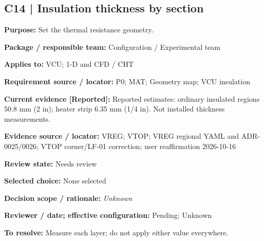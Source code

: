 \documentclass[11pt]{article}
\begin{document}
\par\noindent\begin{minipage}{\textwidth}\small\setlength{\parskip}{2pt}
\subsection*{C14 | Insulation thickness by section}
\textbf{Purpose:} Set the thermal resistance geometry.\par
\textbf{Package / responsible team:} Configuration / Experimental team\par
\textbf{Applies to:} VCU; 1-D and CFD / CHT\par
\textbf{Requirement source / locator:} P0; MAT; Geometry map; VCU insulation\par
\textbf{Current evidence [Reported]:} Reported estimates: ordinary insulated regions 50.8 mm (2 in); heater strip 6.35 mm (1/4 in). Not installed thickness measurements.\par
\textbf{Evidence source / locator:} VREG; VTOP; VREG regional YAML and ADR-0025/0026; VTOP corner/LF-01 correction; user reaffirmation 2026-10-16\par
\textbf{Review state:} Needs review\par
\textbf{Selected choice:} None selected\par
\textbf{Decision scope / rationale:} \textit{Unknown}\par
\textbf{Reviewer / date; effective configuration:} Pending; Unknown\par
\textbf{To resolve:} Measure each layer; do not apply either value everywhere.\par
\end{minipage}\par\vspace{5pt}
\end{document}
